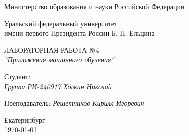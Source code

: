 \thispagestyle{empty}

\begin{center}
	Министерство образования и науки Российской Федерации
	
	\vspace{20pt}
	
	Уральский федеральный университет \\
	имени первого Президента России Б. Н. Ельцина
	
	\vspace{20pt}

\end{center}

\vfill

\begin{center}
	ЛАБОРАТОРНАЯ РАБОТА №4 \\
	\textit{``Приложения машинного обучения``}
	
	\vspace{20pt}
\end{center}

\vfill

	\noindent Студент: \\
	\textit{Группа РИ-240917 \hfill Холкин Николай}
	
	\vspace{5pt}
	
	\noindent Преподаватель: 
	\textit{\hfill Решетников Кирилл Игоревич}
	
	\vspace{20pt}

\vfill

\begin{center}
	Екатеринбург \\ \today
\end{center}

\newpage